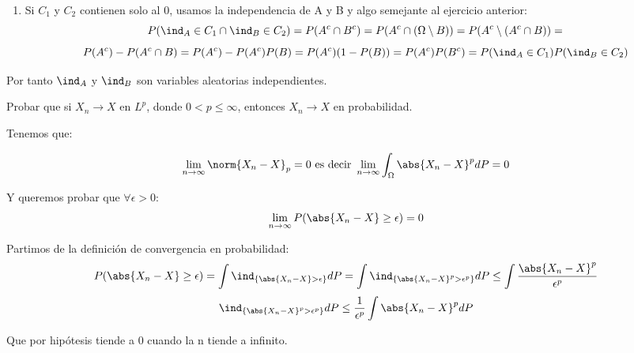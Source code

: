 \begin{problem}[2]
\begin{enumerate}
\item Si $C_1$ y $C_2$ contienen solo al 0, usamos la independencia de A y B y algo semejante al ejercicio anterior:
\[
P(\ind_A \in C_1 \cap \ind_B \in C_2) = P(A^c \cap B^c) = P(A^c\cap(\Omega \setminus B)) = P(A^c \setminus (A^c \cap B)) =
\]
\[
P(A^c)-P(A^c \cap B)=P(A^c)-P(A^c)P(B)= P(A^c)(1-P(B))=P(A^c)P(B^c) = P(\ind_A \in C_1)P(\ind_B \in C_2)
\]


\end{enumerate}


Por tanto $\ind_A$ y $\ind_B$ son variables aleatorias independientes.

\end{problem}


\begin{problem}[3]Probar que si $X_n\to  X$ en $L^p$, donde  $0 < p \le \infty$, entonces $X_n\to  X$ en probabilidad.


\solution


Tenemos que:

\[
\lim_{n \rightarrow \infty} \norm{X_n -X}_p = 0 \text{ es decir } \lim_{n \rightarrow \infty} \int_{\Omega} \abs{X_n -X}^p dP = 0
\]

Y queremos probar que $\forall \epsilon > 0$: 
\[
\lim_{n \rightarrow \infty} P(\abs{X_n -X}\geq \epsilon) = 0
\]

Partimos de la definición de convergencia en probabilidad:
\[
P(\abs{X_n -X}\geq \epsilon) = \int \ind_{\{\abs{X_n - X}> \epsilon\}}dP = \int \ind_{\{\abs{X_n - X}^p> \epsilon^p\}}dP \leq \int \frac{\abs{X_n - X}^p}{\epsilon^p}
\]
\[ \ind_{\{\abs{X_n - X}^p> \epsilon^p\}}dP \leq \frac{1}{\epsilon^p}  \int \abs{X_n - X}^p dP
\]

Que por hipótesis tiende a 0 cuando la n tiende a infinito.



\end{problem}


